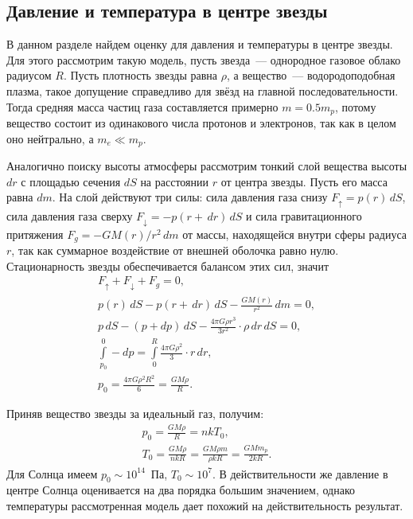 \subsection{Давление и температура в центре звезды}
\label{sec:pressure-and-temperature}
В данном разделе найдем оценку для давления и температуры в центре звезды. Для этого рассмотрим такую модель, пусть звезда~--- однородное газовое облако радиусом $R$. Пусть плотность звезды равна $\rho$, а вещество~--- водородоподобная плазма, такое допущение справедливо для звёзд на главной последовательности. Тогда средняя масса частиц газа составляется примерно $m = 0.5m_p$, потому вещество состоит из одинакового числа протонов и электронов, так как в целом оно нейтрально, а $m_e \ll m_p$.

Аналогично поиску высоты атмосферы рассмотрим тонкий слой вещества высоты $dr$ с площадью сечения $dS$ на расстоянии $r$ от центра звезды. Пусть его масса  равна $dm$. На слой действуют три силы: сила давления газа снизу $F_\uparrow = p(r)\,d S$, сила давления газа сверху $F_\downarrow = -p(r + \,d r)\,d S$ и сила гравитационного притяжения $F_g = -GM(r)/r^2\,d m$ от массы, находящейся внутри сферы радиуса $r$, так как суммарное воздействие от внешней оболочка равно нулю. Стационарность звезды обеспечивается балансом этих сил, значит
\begin{gather*}
    F_\uparrow + F_\downarrow + F_g = 0,\\
    p(r)\,d S - p(r + \,d r)\,d S - \frac{GM(r)}{r^2}\,d m = 0,\\
    p\,d S - (p + dp)\,d S - \frac{4\pi G \rho r^3}{3r^2} \cdot \rho \,d r \,d S = 0,\\
    \int\limits_{p_0}^0 -dp = \int\limits_{0}^R \frac{4\pi G \rho^2}{3} \cdot r\,d r,\\
     p_0 = \frac{4\pi G \rho^2 R^2}{6} = \frac{GM\rho}{R}.
\end{gather*}

Приняв вещество звезды за идеальный газ, получим:
\begin{gather*}
    p_0 = \frac{G M \rho}{R} = n k T_0,\\
    T_0 = \frac{G M \rho}{n k R} = \frac{G M \rho m}{\rho k R} = \frac{G M m_p}{2k R}.
\end{gather*}
Для Солнца имеем $p_0 \sim 10^{14}$~Па, $T_0 \sim 10^7$. В действительности же давление в центре Солнца оценивается на два порядка большим значением, однако температуры рассмотренная модель дает похожий на действительность результат.
